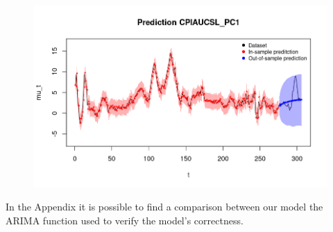 \begin{figure}
    \centering
    \includegraphics[width=\textwidth]{images/4-ARMA/infl_prediction.png}
    \label{fig:ARMA_second}
\end{figure} 
In the Appendix it is possible to find a comparison between our model the ARIMA function used to verify the model's correctness.